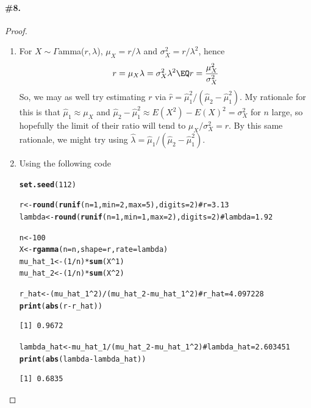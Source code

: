 \documentclass[12pt,titlepage]{article}\usepackage{graphicx, color}
\makeatletter
\newcommand{\hlfunctioncall}[1]{\textcolor[rgb]{0.501960784313725,0,0.329411764705882}{\textbf{#1}}}%
\newcommand{\hlcomment}[1]{\textcolor[rgb]{0.180392156862745,0.6,0.341176470588235}{#1}}%
\newenvironment{kframe}{%
 \def\at@end@of@kframe{}%
 \ifinner\ifhmode%
  \def\at@end@of@kframe{\end{minipage}}%
  \begin{minipage}{\columnwidth}%
 \fi\fi%
 \def\FrameCommand##1{\hskip\@totalleftmargin \hskip-\fboxsep
 \colorbox{shadecolor}{##1}\hskip-\fboxsep
     \hskip-\linewidth \hskip-\@totalleftmargin \hskip\columnwidth}%
 \MakeFramed {\advance\hsize-\width
   \@totalleftmargin\z@ \linewidth\hsize
   \@setminipage}}%
 {\par\unskip\endMakeFramed%
 \at@end@of@kframe}
\newenvironment{knitrout}{}{} %
\makeatother
\begin{document}
\paragraph{\#8.}
\begin{proof}
\begin{enumerate}
\item For $X \sim \Gamma$amma($r,\lambda$), $\mu_{X} = r/\lambda$ and $\sigma_{X}^{2} = r/\lambda^2$, hence
\[
r = \mu_{X} \lambda = \sigma_{X}^{2} \lambda^2 \EQ r= \frac{\mu_{X}^2}{\sigma_{X}^2}
\]
So, we may as well try estimating $r$ via $\hat{r} = \hat{\mu}_{1}^{2}/(\hat{\mu}_{2} - \hat{\mu}_{1}^{2})$. My rationale for this is that $\hat{\mu}_{1} \approx \mu_{X}$ and $\hat{\mu}_{2} - \hat{\mu}_{1}^{2} \approx E(X^2) - E(X)^2 = \sigma_{X}^{2}$ for $n$ large, so hopefully the limit of their ratio will tend to $\mu_{X}/\sigma_{X}^{2} = r$. By this same rationale, we might try using $\hat{\lambda} = \hat{\mu}_{1}/(\hat{\mu}_{2} - \hat{\mu}_{1}^{2})$. 
\item Using the following code

\begin{knitrout}
\color{fgcolor}\begin{kframe}
\begin{alltt}
\hlfunctioncall{set.seed}(112)

r <- \hlfunctioncall{round}(\hlfunctioncall{runif}(n=1,min=2,max=5),digits=2) \hlcomment{# r = 3.13}
lambda <- \hlfunctioncall{round}(\hlfunctioncall{runif}(n=1,min=1,max=2),digits=2) \hlcomment{# lambda = 1.92}

n <- 100
X <- \hlfunctioncall{rgamma}(n=n,shape=r,rate=lambda)
mu_hat_1 <- (1/n)*\hlfunctioncall{sum}(X^1)
mu_hat_2 <- (1/n)*\hlfunctioncall{sum}(X^2)

r_hat <-  (mu_hat_1^2)/(mu_hat_2 - mu_hat_1^2) \hlcomment{# r_hat = 4.097228}
\hlfunctioncall{print}(\hlfunctioncall{abs}(r-r_hat))
\end{alltt}
\begin{verbatim}
[1] 0.9672
\end{verbatim}
\begin{alltt}
lambda_hat <- mu_hat_1/(mu_hat_2 - mu_hat_1^2) \hlcomment{# lambda_hat = 2.603451}
\hlfunctioncall{print}(\hlfunctioncall{abs}(lambda-lambda_hat))
\end{alltt}
\begin{verbatim}
[1] 0.6835
\end{verbatim}
\end{kframe}
\end{knitrout}


\end{enumerate}
\end{proof}
\end{document}
